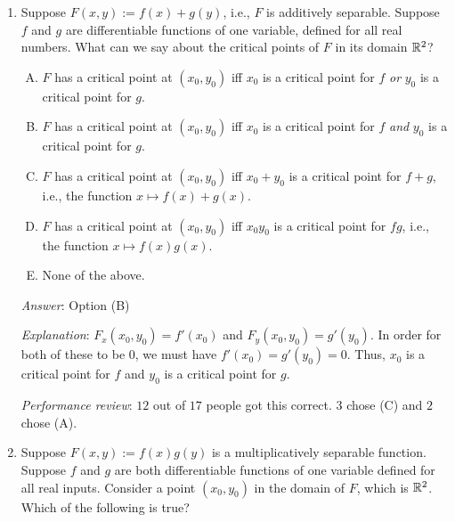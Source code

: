 \documentclass[10pt]{amsart}
\begin{document}
\begin{enumerate}
\item Suppose $F(x,y) := f(x) + g(y)$, i.e., $F$ is additively
  separable. Suppose $f$ and $g$ are differentiable functions of one
  variable, defined for all real numbers. What can we say about the
  critical points of $F$ in its domain $\mathbb{R}^2$?

  \begin{enumerate}[(A)]
  \item $F$ has a critical point at $(x_0,y_0)$ iff $x_0$ is a
    critical point for $f$ {\em or} $y_0$ is a critical point for $g$.
  \item $F$ has a critical point at $(x_0,y_0)$ iff $x_0$ is a
    critical point for $f$ {\em and} $y_0$ is a critical point for
    $g$.
  \item $F$ has a critical point at $(x_0,y_0)$ iff $x_0 + y_0$ is a
    critical point for $f + g$, i.e., the function $x \mapsto f(x) +
    g(x)$.
  \item $F$ has a critical point at $(x_0,y_0)$ iff $x_0y_0$ is a
    critical point for $fg$, i.e., the function $x \mapsto f(x)g(x)$.
  \item None of the above.
  \end{enumerate}
  
  {\em Answer}: Option (B)

  {\em Explanation}: $F_x(x_0,y_0) = f'(x_0)$ and $F_y(x_0,y_0) =
  g'(y_0)$. In order for both of these to be $0$, we must have
  $f'(x_0) = g'(y_0) = 0$. Thus, $x_0$ is a critical point for $f$ and
  $y_0$ is a critical point for $g$.

  {\em Performance review}: $12$ out of $17$ people got this
  correct. $3$ chose (C) and $2$ chose (A).
\item Suppose $F(x,y) := f(x)g(y)$ is a multiplicatively separable
  function. Suppose $f$ and $g$ are both differentiable functions of
  one variable defined for all real inputs. Consider a point
  $(x_0,y_0)$ in the domain of $F$, which is $\mathbb{R}^2$. Which of the
  following is true?


\end{enumerate}
\end{document}
